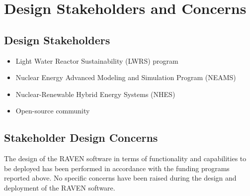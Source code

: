 \section{Design Stakeholders and Concerns}
\subsection{Design Stakeholders}
\begin{itemize}
  \item Light Water Reactor Sustainability (LWRS) program 
  \item Nuclear Energy Advanced Modeling and Simulation Program (NEAMS)
  \item Nuclear-Renewable Hybrid Energy Systems (NHES)
  \item Open-source community 
\end{itemize}
\subsection{Stakeholder Design Concerns}
The design of the RAVEN software in terms of functionality and capabilities to be deployed has been performed in 
accordance with the funding programs reported above. No specific concerns have been raised during the design and 
deployment of the RAVEN software. 
